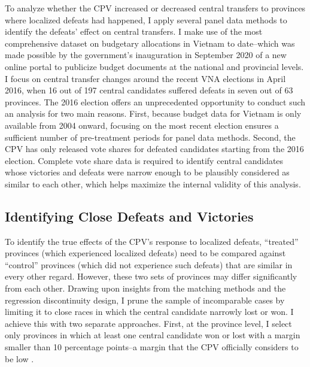 \documentclass[12pt]{article}
\newcommand{\1}{\mathbbm{1}}
\begin{document}
To analyze whether the CPV increased or decreased central transfers to provinces where localized defeats had happened, I apply several panel data methods to identify the defeats' effect on central transfers. I make use of the most comprehensive dataset on budgetary allocations in Vietnam to date--which was made possible by the government's inauguration in September 2020 of a new online portal to publicize budget documents at the national and provincial levels. I focus on central transfer changes around the recent VNA elections in April 2016, when 16 out of 197 central candidates suffered defeats in seven out of 63 provinces. The 2016 election offers an unprecedented opportunity to conduct such an analysis for two main reasons. First, because budget data for Vietnam is only available from 2004 onward, focusing on the most recent election ensures a sufficient number of pre-treatment periods for panel data methods. Second, the CPV has only released vote shares for defeated candidates starting from the 2016 election. Complete vote share data is required to identify central candidates whose victories and defeats were narrow enough to be plausibly considered as similar to each other, which helps maximize the internal validity of this analysis.

\subsection*{Identifying Close Defeats and Victories}
\label{sec:methods_sample}

To identify the true effects of the CPV's response to localized defeats, ``treated'' provinces (which experienced localized defeats) need to be compared against ``control'' provinces (which did not experience such defeats) that are similar in every other regard. However, these two sets of provinces may differ significantly from each other. 
Drawing upon insights from the matching methods and the regression discontinuity design, I prune the sample of incomparable cases by limiting it to close races in which the central candidate narrowly lost or won. I achieve this with two separate approaches. First, at the province level, I select only provinces in which at least one central candidate won or lost with a margin smaller than 10 percentage points--a margin that the CPV officially considers to be low \citep{MaleskySchuler2011}.
\end{document}
